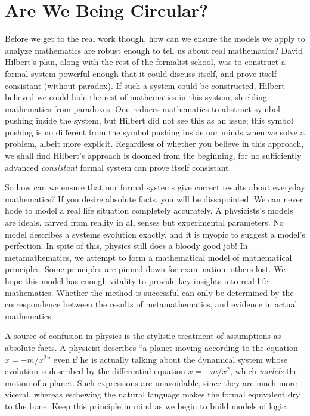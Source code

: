 \section{Are We Being Circular?}

Before we get to the real work though, how can we ensure the models we apply to analyze mathematics are robust enough to tell us about real mathematics? David Hilbert's plan, along with the rest of the formalist school, was to construct a formal system powerful enough that it could discuss itself, and prove itself consistant (without paradox). If such a system could be constructed, Hilbert believed we could hide the rest of mathematics in this system, shielding mathematics from paradoxes. One reduces mathematics to abstract symbol pushing inside the system, but Hilbert did not see this as an issue; this symbol pushing is no different from the symbol pushing inside our minds when we solve a problem, albeit more explicit. Regardless of whether you believe in this approach, we shall find Hilbert's approach is doomed from the beginning, for no sufficiently advanced {\it consistant} formal system can prove itself consistant.

So how can we ensure that our formal systems give correct results about everyday mathematics? If you desire absolute facts, you will be dissapointed. We can never hode to model a real life situation completely accurately. A physicists's models are ideals, carved from reality in all senses but experimental parameters. No model describes a systems evolution exactly, and it is myopic to suggest a model's perfection. In spite of this, physics still does a bloody good job! In metamathematics, we attempt to form a mathematical model of mathematical principles. Some principles are pinned down for examination, others lost. We hope this model has enough vitality to provide key insights into real-life mathematics. Whether the method is successful can only be determined by the correspondence between the results of metamathematics, and evidence in actual mathematics.

A source of confusion in physics is the stylistic treatment of assumptions as absolute facts. A physicist describes ``a planet moving according to the equation $\ddot{x} = -m/x^2$'' even if he is actually talking about the dynamical system whose evolution is described by the differential equation $\ddot{x} = -m/x^2$, which {\it models} the motion of a planet. Such expressions are unavoidable, since they are much more viceral, whereas eschewing the natural language makes the formal equivalent dry to the bone. Keep this principle in mind as we begin to build models of logic.






